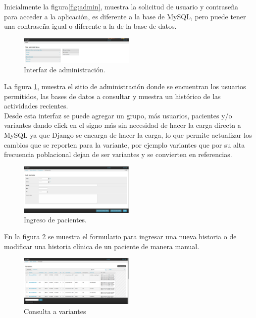 Inicialmente la figura\ref{fig:admin}, muestra la solicitud de usuario y contraseña para acceder a la aplicación, es diferente a la base de MySQL, pero  puede tener  una contraseña igual o diferente a la de la base de datos.

\begin{figure}[h] 
	\centering
	\includegraphics[width=0.5\textwidth]{Kap3/django_admin}
	\caption{Interfaz de administración.} \label{fig:admin2}
\end{figure}

La figura \ref{fig:admin2}, muestra el sitio de administración donde se encuentran los usuarios permitidos, las bases de datos a consultar y muestra un histórico de las actividades recientes. \\

Desde esta interfaz se puede agregar un grupo, más usuarios, pacientes y/o variantes dando click en el signo más sin necesidad de hacer la carga directa a MySQL ya que Django se encarga de hacer la carga, lo que permite actualizar los cambios que se reporten para la variante, por ejemplo variantes que por su alta frecuencia poblacional dejan de ser variantes y se convierten en referencias. \\

\begin{figure}[h] 
	\centering
	\includegraphics[width=0.5\textwidth]{Kap3/ingresar_paciente}
	\caption{Ingreso de pacientes.} \label{fig:pacientes}
\end{figure}

En la figura \ref{fig:pacientes} se muestra el formulario para ingresar una nueva historia o de modificar una historia clínica de un paciente de manera manual.

\begin{figure}[h] 
	\centering
	\includegraphics[width=0.5\textwidth]{Kap3/consulta}
	\caption{Consulta a variantes} \label{fig:consulta}
\end{figure}


